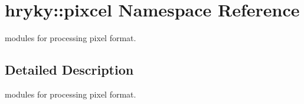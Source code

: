 \hypertarget{namespacehryky_1_1pixcel}{\section{hryky\-:\-:pixcel Namespace Reference}
\label{namespacehryky_1_1pixcel}
}


modules for processing pixel format.  




\subsection{Detailed Description}
modules for processing pixel format. 